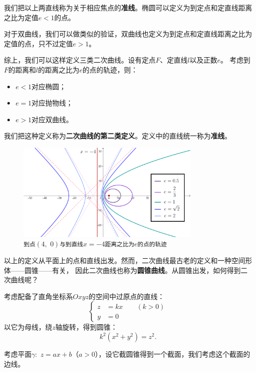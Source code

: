 \documentclass[12pt,UTF8]{ctexbook}
\theoremstyle{definition}
\theoremstyle{plain}
\begin{document}
我们把以上两直线称为关于相应焦点的\textbf{准线}。椭圆可以定义为到定点和定直线距离之比为定值$e<1$的点。

对于双曲线，我们可以做类似的验证，双曲线也定义为到定点和定直线距离之比为定值的点，只不过定值$e > 1$。

综上，我们可以这样定义三类二次曲线。设有定点$F$、定直线$l$以及正数$e$。
考虑到$F$的距离和$l$的距离之比为$e$的点的轨迹，则：
\begin{itemize}
    \item $e<1$对应椭圆；
    \item $e = 1$对应抛物线；
    \item $e >1$对应双曲线。
\end{itemize}
我们把这种定义称为\textbf{二次曲线的第二类定义}。定义中的直线统一称为\textbf{准线}。

\begin{figure}[h] 
    \centering
    \includegraphics[width=0.8\textwidth]{tu/二次曲线第二定义1.png}
    \caption*{\texttt{到点}$(4,\,\,0)$\texttt{与到直线}$x=-4$\texttt{距离之比为}$e$\texttt{的点的轨迹}}
\end{figure}
以上的定义从平面上的点和直线出发。然而，二次曲线最古老的定义和一种空间形体——圆锥——有关，
因此二次曲线也称为\textbf{圆锥曲线}。从圆锥出发，如何得到二次曲线呢？

考虑配备了直角坐标系$Oxyz$的空间中过原点的直线：
$$ 
\left\{
    \begin{array}{cl}
        z &= kx \qquad (k > 0) \\
        y &= 0
    \end{array}
\right.
$$
以它为母线，绕$z$轴旋转，得到圆锥：
$$ k^2(x^2 + y^2) = z^2. $$

考虑平面$\gamma: \,\,z = ax + b$（$a > 0$），设它截圆锥得到一个截面，我们考虑这个截面的边线。
\end{document}
